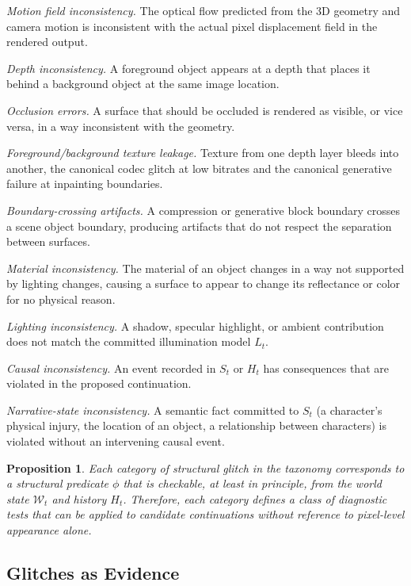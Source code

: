 \documentclass[11pt,a4paper]{article}
\theoremstyle{plain}
\newtheorem{proposition}[theorem]{Proposition}
\theoremstyle{definition}
\theoremstyle{remark}
\begin{document}
\textit{Motion field inconsistency.} The optical flow predicted from the 3D geometry and camera motion is inconsistent with the actual pixel displacement field in the rendered output.

\textit{Depth inconsistency.} A foreground object appears at a depth that places it behind a background object at the same image location.

\textit{Occlusion errors.} A surface that should be occluded is rendered as visible, or vice versa, in a way inconsistent with the geometry.

\textit{Foreground/background texture leakage.} Texture from one depth layer bleeds into another, the canonical codec glitch at low bitrates and the canonical generative failure at inpainting boundaries.

\textit{Boundary-crossing artifacts.} A compression or generative block boundary crosses a scene object boundary, producing artifacts that do not respect the separation between surfaces.

\textit{Material inconsistency.} The material of an object changes in a way not supported by lighting changes, causing a surface to appear to change its reflectance or color for no physical reason.

\textit{Lighting inconsistency.} A shadow, specular highlight, or ambient contribution does not match the committed illumination model $L_t$.

\textit{Causal inconsistency.} An event recorded in $S_t$ or $H_t$ has consequences that are violated in the proposed continuation.

\textit{Narrative-state inconsistency.} A semantic fact committed to $S_t$ (a character's physical injury, the location of an object, a relationship between characters) is violated without an intervening causal event.

\begin{proposition}
Each category of structural glitch in the taxonomy corresponds to a structural predicate $\phi$ that is checkable, at least in principle, from the world state $\mathcal{W}_t$ and history $H_t$. Therefore, each category defines a class of diagnostic tests that can be applied to candidate continuations without reference to pixel-level appearance alone.
\end{proposition}

\subsection{Glitches as Evidence}
\end{document}
